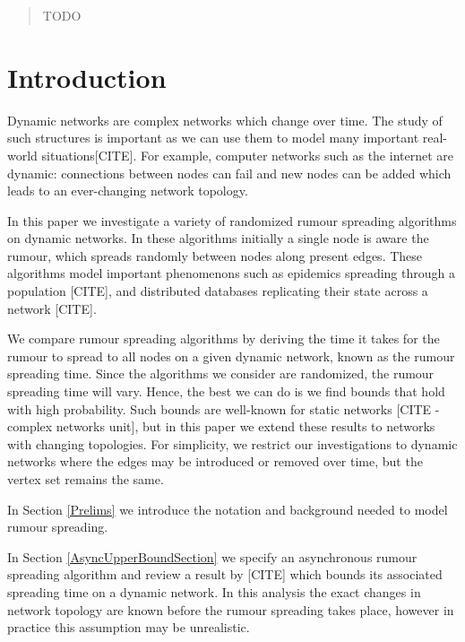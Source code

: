 \documentclass[a4paper,11pt]{article}
\theoremstyle{definition}
\begin{document}



\begin{abstract}
	TODO
\end{abstract}
	
	
\tableofcontents


\section{Introduction}

Dynamic networks are complex networks which change over time. The study of such structures is important as we can use them to model many important real-world situations[CITE]. For example, computer networks such as the internet are dynamic: connections between nodes can fail and new nodes can be added which leads to an ever-changing network topology. 

In this paper we investigate a variety of randomized rumour spreading algorithms on dynamic networks. In these algorithms initially a single node is aware the rumour, which spreads randomly between nodes along present edges. These algorithms model important phenomenons such as epidemics spreading through a population [CITE], and distributed databases replicating their state across a network [CITE]. 

We compare rumour spreading algorithms by deriving the time it takes for the rumour to spread to all nodes on a given dynamic network, known as the rumour spreading time. Since the algorithms we consider are randomized, the rumour spreading time will vary. Hence, the best we can do is we find bounds that hold with high probability. Such bounds are well-known for static networks [CITE - complex networks unit], but in this paper we extend these results to networks with changing topologies. For simplicity, we restrict our investigations to dynamic networks where the edges may be introduced or removed over time, but the vertex set remains the same.

In Section \ref{Prelims} we introduce the notation and background needed to model rumour spreading.

In Section \ref{AsyncUpperBoundSection} we specify an asynchronous rumour spreading algorithm and review a result by [CITE] which bounds its associated spreading time on a dynamic network. In this analysis the exact changes in network topology are known before the rumour spreading takes place, however in practice this assumption may be unrealistic.
\end{document}
